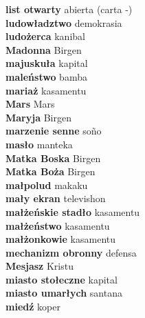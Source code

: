 \textbf{ list otwarty  } abierta (carta -) \\
\textbf{ ludowładztwo  } demokrasia \\
\textbf{ ludożerca  } kanibal \\
\textbf{ Madonna  } Birgen \\
\textbf{ majuskuła  } kapital \\
\textbf{ maleństwo  } bamba \\
\textbf{ mariaż  } kasamentu \\
\textbf{ Mars  } Mars \\
\textbf{ Maryja  } Birgen \\
\textbf{ marzenie senne  } soño \\
\textbf{ masło  } manteka \\
\textbf{ Matka Boska  } Birgen \\
\textbf{ Matka Boża  } Birgen \\
\textbf{ małpolud  } makaku \\
\textbf{ mały ekran  } televishon \\
\textbf{ małżeńskie stadło  } kasamentu \\
\textbf{ małżeństwo  } kasamentu \\
\textbf{ małżonkowie  } kasamentu \\
\textbf{ mechanizm obronny  } defensa \\
\textbf{ Mesjasz  } Kristu \\
\textbf{ miasto stołeczne  } kapital \\
\textbf{ miasto umarłych  } santana \\
\textbf{ miedź  } koper \\
